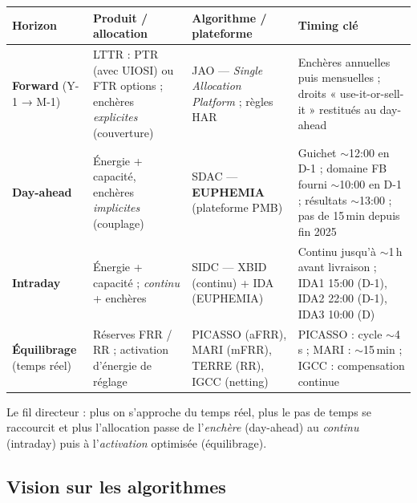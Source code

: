 \documentclass[11pt,a4paper]{article}
\begin{document}
\begin{center}\footnotesize
\renewcommand{\arraystretch}{1.25}
\setlength{\tabcolsep}{4pt}
\begin{tabular}{@{}p{1.95cm}p{3.75cm}p{3.85cm}p{4.35cm}@{}}
\toprule
\textbf{Horizon} & \textbf{Produit / allocation} & \textbf{Algorithme / plateforme} & \textbf{Timing clé} \\
\midrule
\textbf{Forward} \newline (Y-1 → M-1) &
LTTR : PTR (avec UIOSI) ou FTR options ; enchères \emph{explicites} (couverture) &
JAO — \emph{Single Allocation Platform} ; règles HAR &
Enchères annuelles puis mensuelles ; droits « use-it-or-sell-it » restitués au day-ahead \\
\textbf{Day-ahead} &
Énergie + capacité, enchères \emph{implicites} (couplage) &
SDAC — \textbf{EUPHEMIA} (plateforme PMB) &
Guichet $\sim$12:00 en D-1 ; domaine FB fourni $\sim$10:00 en D-1 ; résultats $\sim$13:00 ; pas de 15\,min depuis fin 2025 \\
\textbf{Intraday} &
Énergie + capacité ; \emph{continu} + enchères &
SIDC — XBID (continu) + IDA (EUPHEMIA) &
Continu jusqu'à $\sim$1\,h avant livraison ; IDA1 15:00 (D-1), IDA2 22:00 (D-1), IDA3 10:00 (D) \\
\textbf{Équilibrage} \newline (temps réel) &
Réserves FRR / RR ; activation d'énergie de réglage &
PICASSO (aFRR), MARI (mFRR), TERRE (RR), IGCC (netting) &
PICASSO : cycle $\sim$4\,s ; MARI : $\sim$15\,min ; IGCC : compensation continue \\
\bottomrule
\end{tabular}
\end{center}

\noindent Le fil directeur : plus on s'approche du temps réel, plus le pas
de temps se raccourcit et plus l'allocation passe de l'\emph{enchère}
(day-ahead) au \emph{continu} (intraday) puis à l'\emph{activation}
optimisée (équilibrage).

\subsection{Vision sur les algorithmes}
\end{document}
